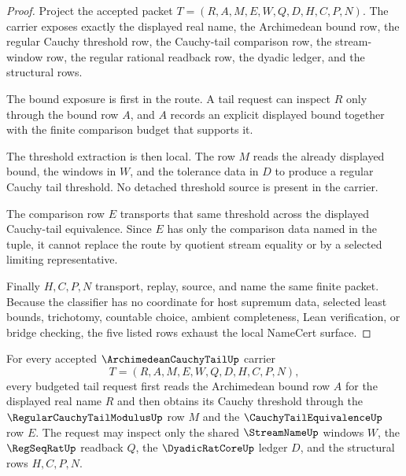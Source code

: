 \begin{proof}
Project the accepted packet $T=(R,A,M,E,W,Q,D,H,C,P,N)$. The carrier exposes exactly the displayed real name, the Archimedean bound row, the regular Cauchy threshold row, the Cauchy-tail comparison row, the stream-window row, the regular rational readback row, the dyadic ledger, and the structural rows.

The bound exposure is first in the route. A tail request can inspect $R$ only through the bound row $A$, and $A$ records an explicit displayed bound together with the finite comparison budget that supports it.

The threshold extraction is then local. The row $M$ reads the already displayed bound, the windows in $W$, and the tolerance data in $D$ to produce a regular Cauchy tail threshold. No detached threshold source is present in the carrier.

The comparison row $E$ transports that same threshold across the displayed Cauchy-tail equivalence. Since $E$ has only the comparison data named in the tuple, it cannot replace the route by quotient stream equality or by a selected limiting representative.

Finally $H,C,P,N$ transport, replay, source, and name the same finite packet. Because the classifier has no coordinate for host supremum data, selected least bounds, trichotomy, countable choice, ambient completeness, Lean verification, or bridge checking, the five listed rows exhaust the local NameCert surface.
\end{proof}

\begin{theorem}
\label{thm:archimedean-cauchy-tail-threshold-envelope}
For every accepted $\ArchimedeanCauchyTailUp$ carrier
$$
T=(R,A,M,E,W,Q,D,H,C,P,N),
$$
every budgeted tail request first reads the Archimedean bound row $A$ for the displayed real name $R$ and then obtains its Cauchy threshold through the $\RegularCauchyTailModulusUp$ row $M$ and the $\CauchyTailEquivalenceUp$ row $E$. The request may inspect only the shared $\StreamNameUp$ windows $W$, the $\RegSeqRatUp$ readback $Q$, the $\DyadicRatCoreUp$ ledger $D$, and the structural rows $H,C,P,N$.
\end{theorem}

